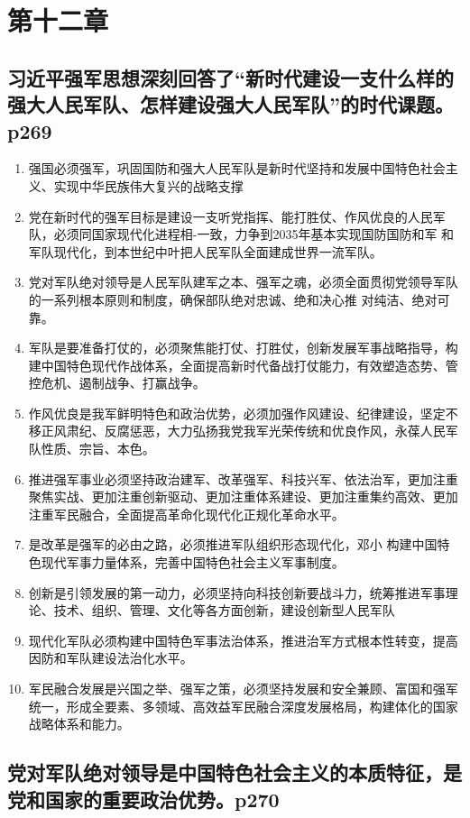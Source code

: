 \documentclass[UTF8]{ctexart}
\begin{document}
\section{第十二章}
\subsection{习近平强军思想深刻回答了“新时代建设一支什么样的强大人民军队、怎样建设强大人民军队”的时代课题。p269}
\begin{enumerate}[(1)]
    \item 强国必须强军，巩固国防和强大人民军队是新时代坚持和发展中国特色社会主义、实现中华民族伟大复兴的战略支撑
    \item 党在新时代的强军目标是建设一支听党指挥、能打胜仗、作风优良的人民军队，必须同国家现代化进程相-一致，力争到2035年基本实现国防国防和军  和军队现代化，到本世纪中叶把人民军队全面建成世界一流军队。
    \item 党对军队绝对领导是人民军队建军之本、强军之魂，必须全面贯彻党领导军队的一系列根本原则和制度，确保部队绝对忠诚、绝和决心推  对纯洁、绝对可靠。
    \item 军队是要准备打仗的，必须聚焦能打仗、打胜仗，创新发展军事战略指导，构建中国特色现代作战体系，全面提高新时代备战打仗能力，有效塑造态势、管控危机、遏制战争、打赢战争。
    \item 作风优良是我军鲜明特色和政治优势，必须加强作风建设、纪律建设，坚定不移正风肃纪、反腐惩恶，大力弘扬我党我军光荣传统和优良作风，永葆人民军队性质、宗旨、本色。
    \item 推进强军事业必须坚持政治建军、改革强军、科技兴军、依法治军，更加注重聚焦实战、更加注重创新驱动、更加注重体系建设、更加注重集约高效、更加注重军民融合，全面提高革命化现代化正规化革命水平。
    \item 是改革是强军的必由之路，必须推进军队组织形态现代化，邓小  构建中国特色现代军事力量体系，完善中国特色社会主义军事制度。
    \item 创新是引领发展的第一动力，必须坚持向科技创新要战斗力，统筹推进军事理论、技术、组织、管理、文化等各方面创新，建设创新型人民军队
    \item 现代化军队必须构建中国特色军事法治体系，推进治军方式根本性转变，提高因防和军队建设法治化水平。
    \item 军民融合发展是兴国之举、强军之策，必须坚持发展和安全兼顾、富国和强军统一，形成全要素、多领域、高效益军民融合深度发展格局，构建体化的国家战略体系和能力。
\end{enumerate}
\subsection{党对军队绝对领导是中国特色社会主义的本质特征，是党和国家的重要政治优势。p270}
\end{document}
